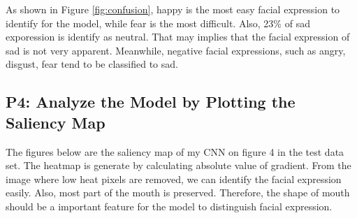 \documentclass[fleqn,a4paper,12pt]{article}
\begin{document}
As shown in Figure \ref{fig:confusion}, happy is the most easy facial expression to identify for the model, while fear is the most difficult. Also, 23\% of sad exporession is identify as neutral. That may implies that the facial expression of sad is not very apparent. Meanwhile, negative facial expressions, such as angry, disgust, fear tend to be classified to sad.

\subsection*{P4: Analyze the Model by Plotting the Saliency Map}

The figures below are the saliency map of my CNN on figure 4 in the test data set. The heatmap is generate by calculating absolute value of gradient. From the image where low heat pixels are removed, we can identify the facial expression easily. Also, most part of the mouth is preserved. Therefore, the shape of mouth should be a important feature for the model to distinguish facial expression.
\end{document}
